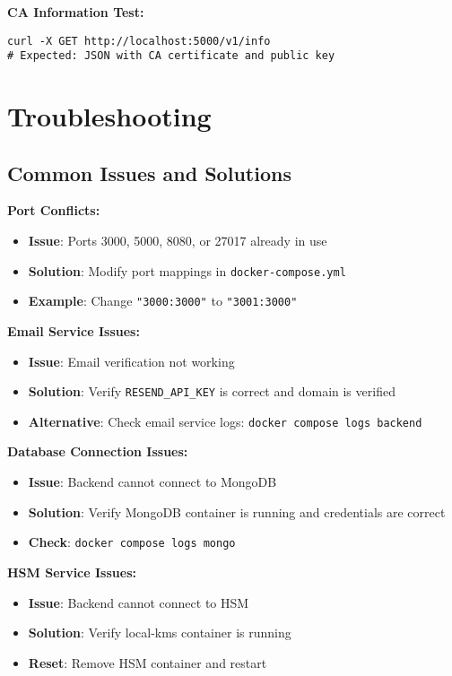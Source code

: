 \textbf{CA Information Test:}
\begin{verbatim}
curl -X GET http://localhost:5000/v1/info
# Expected: JSON with CA certificate and public key
\end{verbatim}

\section{Troubleshooting}

\subsection{Common Issues and Solutions}

\textbf{Port Conflicts:}
\begin{itemize}
    \item \textbf{Issue}: Ports 3000, 5000, 8080, or 27017 already in use
    \item \textbf{Solution}: Modify port mappings in \texttt{docker-compose.yml}
    \item \textbf{Example}: Change \texttt{"3000:3000"} to \texttt{"3001:3000"}
\end{itemize}

\textbf{Email Service Issues:}
\begin{itemize}
    \item \textbf{Issue}: Email verification not working
    \item \textbf{Solution}: Verify \texttt{RESEND\_API\_KEY} is correct and domain is verified
    \item \textbf{Alternative}: Check email service logs: \texttt{docker compose logs backend}
\end{itemize}

\textbf{Database Connection Issues:}
\begin{itemize}
    \item \textbf{Issue}: Backend cannot connect to MongoDB
    \item \textbf{Solution}: Verify MongoDB container is running and credentials are correct
    \item \textbf{Check}: \texttt{docker compose logs mongo}
\end{itemize}

\textbf{HSM Service Issues:}
\begin{itemize}
    \item \textbf{Issue}: Backend cannot connect to HSM
    \item \textbf{Solution}: Verify local-kms container is running
    \item \textbf{Reset}: Remove HSM container and restart
\end{itemize}

